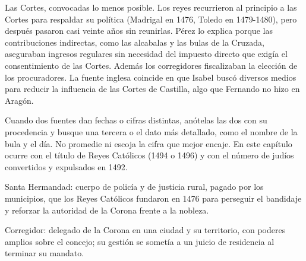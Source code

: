 \documentclass{book}
\begin{document}
\begin{tcolorbox}[title={Consejo}, studiumtip, breakable]

Las Cortes, convocadas lo menos posible. Los reyes recurrieron al principio a las Cortes para respaldar su política (Madrigal en 1476, Toledo en 1479-1480), pero después pasaron casi veinte años sin reunirlas. Pérez lo explica porque las contribuciones indirectas, como las alcabalas y las bulas de la Cruzada, aseguraban ingresos regulares sin necesidad del impuesto directo que exigía el consentimiento de las Cortes. Además los corregidores fiscalizaban la elección de los procuradores. La fuente inglesa coincide en que Isabel buscó diversos medios para reducir la influencia de las Cortes de Castilla, algo que Fernando no hizo en Aragón.


Cuando dos fuentes dan fechas o cifras distintas, anótelas las dos con su procedencia y busque una tercera o el dato más detallado, como el nombre de la bula y el día. No promedie ni escoja la cifra que mejor encaje. En este capítulo ocurre con el título de Reyes Católicos (1494 o 1496) y con el número de judíos convertidos y expulsados en 1492.

\end{tcolorbox}

\begin{tcolorbox}[title={Definición}, studiumdef, breakable]

Santa Hermandad: cuerpo de policía y de justicia rural, pagado por los municipios, que los Reyes Católicos fundaron en 1476 para perseguir el bandidaje y reforzar la autoridad de la Corona frente a la nobleza.

\end{tcolorbox}

\begin{tcolorbox}[title={Definición}, studiumdef, breakable]

Corregidor: delegado de la Corona en una ciudad y su territorio, con poderes amplios sobre el concejo; su gestión se sometía a un juicio de residencia al terminar su mandato.

\end{tcolorbox}
\end{document}
